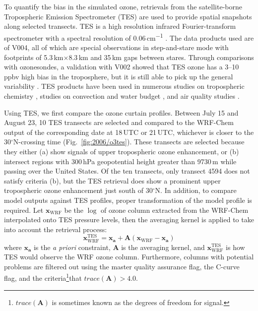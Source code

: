 To quantify the bias in the simulated ozone, retrievals from the satellite-borne Tropospheric Emission Spectrometer (TES) are used
to provide spatial snapshots along selected transects. TES is a high resolution infrared Fourier-transform spectrometer with a spectral
resolution of 0.06\,\unit{cm^{-1}} \citep{Beer:2006fk}. The data products used are of V004, all of which are special observations in
step-and-stare mode with footprints of 5.3\,\unit{km}$\times$8.3\,\unit{km} and 35\,\unit{km} gaps between stares. Through comparisons
with ozonesondes, a validation with V002 showed that TES ozone has a 3--10\,\unit{ppbv} high bias in the troposphere, but it is still
able to pick up the general variability \citep{Nassar:2008mw}. TES products have been used in numerous studies on tropospheric
chemistry \citep[e.g.][]{Hegarty:2010vn,Voulgarakis:2011fk}, studies on convection and water budget \citep[e.g.][]{Brown:2008zr,Risi:2010ys},
and air quality studies \citep[e.g.][]{Mcmillan:2010kx, Wang:2011uq}.


Using TES, we first compare the ozone curtain profiles. Between July 15 and August 23, 10 TES transects are selected and compared to
the WRF-Chem output of the corresponding date at 18\,UTC or 21\,UTC, whichever is closer to the 30$^\circ$N-crossing time (Fig.~\ref{fig:2006/o3tes}).
These transects are selected because they either (a) show signals of upper tropospheric ozone enhancement, or (b) intersect regions
with 300\,\unit{hPa} geopotential height greater than 9730\,\unit{m} while passing over the United States. Of the ten transects, only transect 4594
does not satisfy criteria (b), but the TES retrieval does show a prominent upper tropospheric ozone enhancement just south of 30$^\circ$N. In
addition, to compare model outputs against TES profiles, proper transformation of the model profile is required. Let $\mathbf{x}_{\mathrm{WRF}}$
be the $\log$ of ozone column extracted from the WRF-Chem interpolated onto TES pressure levels, then the averaging kernel is applied to take
into account the retrieval process:
	\begin{equation}\label{eqn:TES-AK}
		\mathbf{x}_{\mathrm{WRF}}^{\mathrm{TES}} = \mathbf{x_a} + \mathbf{A}\left(\mathbf{x}_{\mathrm{WRF}}-\mathbf{x_a}\right)
	\end{equation}
where $\mathbf{x_a}$ is the {\it a priori} constraint, $\mathbf{A}$ is the averaging kernel, and $\mathbf{x}_{\mathrm{WRF}}^{\mathrm{TES}}$
is how TES would observe the WRF ozone column. Furthermore, columns with potential problems are filtered out using the master quality
assurance flag, the C-curve flag, and the criteria\footnote{$trace(\mathbf{A})$ is sometimes known as the degrees of freedom for signal.}that
$trace(\mathbf{A})>4.0$.
	
